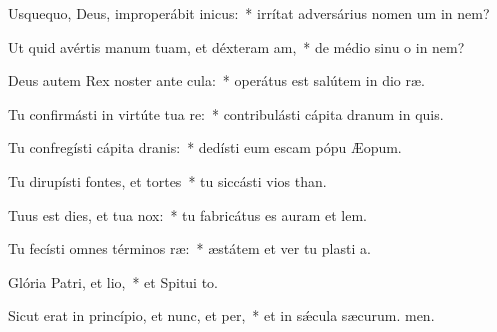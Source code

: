 \item Usquequo, Deus, improperábit inicus:~* irrítat adversárius nomen um in nem?
\item Ut quid avértis manum tuam, et déxteram am,~* de médio sinu o in nem?
\item Deus autem Rex noster ante cula:~* operátus est salútem in dio ræ.
\item Tu confirmásti in virtúte tua re:~* contribulásti cápita dranum in quis.
\item Tu confregísti cápita dranis:~* dedísti eum escam pópu Æopum.
\item Tu dirupísti fontes, et tortes~* tu siccásti vios than.
\item Tuus est dies, et tua  nox:~* tu fabricátus es auram et lem.
\item Tu fecísti omnes términos ræ:~* æstátem et ver tu plasti a.
\item Glória Patri, et lio,~* et Spitui to.
\item Sicut erat in princípio, et nunc, et per,~* et in sǽcula sæcurum. men.

